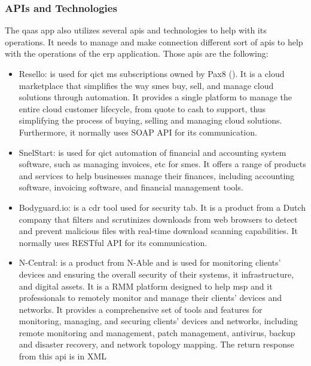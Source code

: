 \subsubsection{APIs and Technologies}
The \acrshort{qaas} app also utilizes several \acrshort{api}s and technologies to help with its operations.
It needs to manage and make connection different sort of \acrshort{api}s to help with the operations of the
\acrshort{erp} application. Those \acrshort{api}s are the following:
\begin{itemize}
      \item Resello: is used for \acrshort{qict} \acrshort{ms} subscriptions owned by Pax8 (\textit{\cite{resello}}).
            It is a cloud marketplace that simplifies the way \acrshort{sme}s buy, sell, and manage cloud solutions
            through automation. It provides a single platform to manage the entire cloud customer lifecycle, from
            quote to cash to support, thus simplifying the process of buying, selling and managing cloud
            solutions. Furthermore, it normally uses \gls{SOAP API} for its communication.
      \item SnelStart: is used for \acrshort{qict} automation of financial and accounting system software,
            such as managing invoices, \acrshort{etc} for \acrshort{sme}s. It offers a range of products and
            services to help businesses manage their finances, including accounting software, invoicing software,
            and financial management tools.
      \item Bodyguard.io: is a \acrshort{cdr} tool used for security tab. It is a product from a Dutch company
            that filters and scrutinizes downloads from web browsers to detect and prevent malicious files with
            real-time download scanning capabilities. It normally uses \gls{RESTful API} for its
            communication.
      \item N-Central: is a product from N-Able and is used for monitoring clients' devices and ensuring the
            overall security of their systems, \acrshort{it} infrastructure, and digital assets. It is a
            \gls{RMM} platform designed to help \acrshort{msp} and \acrshort{it} professionals to
            remotely monitor and manage their clients' devices and networks. It provides a comprehensive
            set of tools and features for monitoring, managing, and securing clients' devices and networks,
            including remote monitoring and management, patch management, antivirus, backup and disaster
            recovery, and network topology mapping. The return response from this \acrshort{api} is in \gls{XML}

\end{itemize}

